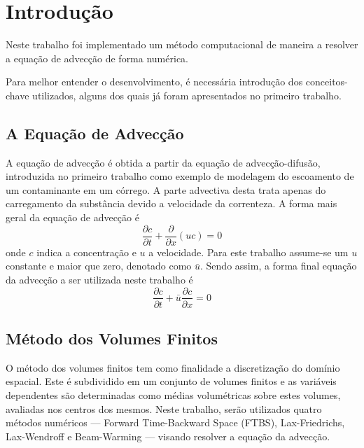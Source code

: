 \chapter{Introdução}
Neste trabalho foi implementado um método computacional de maneira a resolver
a equação de advecção de forma numérica.

Para melhor entender o desenvolvimento, é necessária introdução dos\linebreak
conceitos-chave utilizados, alguns dos quais já foram apresentados no primeiro
trabalho.

\section{A Equação de Advecção}
A equação de advecção é obtida a partir da equação de advecção-difusão,
introduzida no primeiro trabalho como exemplo de modelagem do escoamento de um
contaminante em um córrego. A parte advectiva desta trata apenas do
carregamento da substância devido a velocidade da correnteza. A forma mais
geral da equação de advecção é
\begin{equation}
    \frac{\partial c}{\partial t} + \frac{\partial}{\partial x}(uc) = 0
\end{equation}
onde $c$ indica a concentração e $u$ a velocidade. Para este trabalho
assume-se um $u$ constante e maior que zero, denotado como $\bar{u}$. Sendo
assim, a forma final equação da advecção a ser utilizada neste trabalho é
\begin{equation}\label{adv}
    \frac{\partial c}{\partial t} + \bar{u}\frac{\partial c}{\partial x} = 0
\end{equation}

\section{Método dos Volumes Finitos}
O método dos volumes finitos tem como finalidade a discretização do domínio
espacial. Este é subdividido em um conjunto de volumes finitos e as variáveis
dependentes são determinadas como médias volumétricas sobre estes volumes,
avaliadas nos centros dos mesmos. Neste trabalho, serão utilizados quatro
métodos numéricos --- Forward Time-Backward Space (FTBS), Lax-Friedrichs,
Lax-Wendroff e Beam-Warming --- visando resolver a equação da advecção.